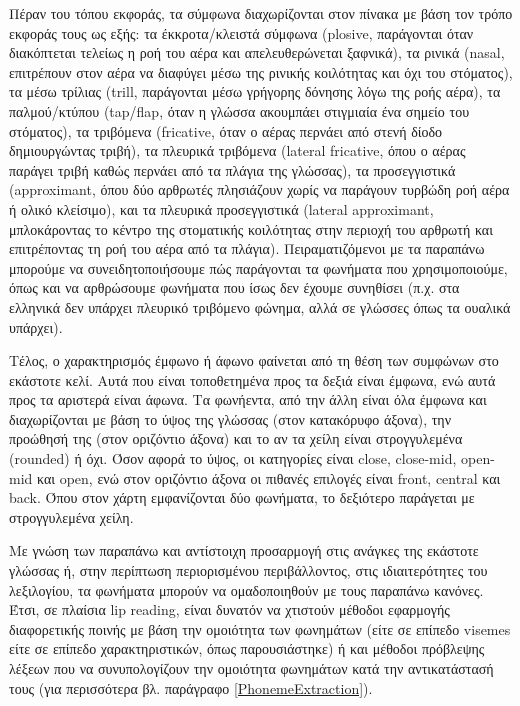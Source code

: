 Πέραν του τόπου εκφοράς, τα σύμφωνα διαχωρίζονται στον πίνακα με βάση τον τρόπο εκφοράς τους ως εξής: τα έκκροτα/κλειστά σύμφωνα (plosive, παράγονται όταν διακόπτεται τελείως η ροή του αέρα και απελευθερώνεται ξαφνικά), τα ρινικά (nasal, επιτρέπουν στον αέρα να διαφύγει μέσω της ρινικής κοιλότητας και όχι του στόματος), τα μέσω τρίλιας (trill, παράγονται μέσω γρήγορης δόνησης λόγω της ροής αέρα), τα παλμού/κτύπου (tap/flap, όταν η γλώσσα ακουμπάει στιγμιαία ένα σημείο του στόματος), τα τριβόμενα (fricative, όταν ο αέρας περνάει από στενή δίοδο δημιουργώντας τριβή), τα πλευρικά τριβόμενα (lateral fricative, όπου ο αέρας παράγει τριβή καθώς περνάει από τα πλάγια της γλώσσας), τα προσεγγιστικά (approximant, όπου δύο αρθρωτές πλησιάζουν χωρίς να παράγουν τυρβώδη ροή αέρα ή ολικό κλείσιμο), και τα πλευρικά προσεγγιστικά (lateral approximant, μπλοκάροντας το κέντρο της στοματικής κοιλότητας στην περιοχή του αρθρωτή και επιτρέποντας τη ροή του αέρα από τα πλάγια). Πειραματιζόμενοι με τα παραπάνω μπορούμε να συνειδητοποιήσουμε πώς παράγονται τα φωνήματα που χρησιμοποιούμε, όπως και να αρθρώσουμε φωνήματα που ίσως δεν έχουμε συνηθίσει (π.χ. στα ελληνικά δεν υπάρχει πλευρικό τριβόμενο φώνημα, αλλά σε γλώσσες όπως τα ουαλικά υπάρχει).

Τέλος, ο χαρακτηρισμός έμφωνο ή άφωνο φαίνεται από τη θέση των συμφώνων στο εκάστοτε κελί. Αυτά που είναι τοποθετημένα προς τα δεξιά είναι έμφωνα, ενώ αυτά προς τα αριστερά είναι άφωνα. Τα φωνήεντα, από την άλλη είναι όλα έμφωνα και διαχωρίζονται με βάση το ύψος της γλώσσας (στον κατακόρυφο άξονα), την προώθησή της (στον οριζόντιο άξονα) και το αν τα χείλη είναι στρογγυλεμένα (rounded) ή όχι. Όσον αφορά το ύψος, οι κατηγορίες είναι close, close-mid, open-mid και open, ενώ στον οριζόντιο άξονα οι πιθανές επιλογές είναι front, central και back. Όπου στον χάρτη εμφανίζονται δύο φωνήματα, το δεξιότερο παράγεται με στρογγυλεμένα χείλη.

Με γνώση των παραπάνω και αντίστοιχη προσαρμογή στις ανάγκες της εκάστοτε γλώσσας ή, στην περίπτωση περιορισμένου περιβάλλοντος, στις ιδιαιτερότητες του λεξιλογίου, τα φωνήματα μπορούν να ομαδοποιηθούν με τους παραπάνω κανόνες. Έτσι, σε πλαίσια lip reading, είναι δυνατόν να χτιστούν μέθοδοι εφαρμογής διαφορετικής ποινής με βάση την ομοιότητα των φωνημάτων (είτε σε επίπεδο visemes είτε σε επίπεδο χαρακτηριστικών, όπως παρουσιάστηκε) ή και μέθοδοι πρόβλεψης λέξεων που να συνυπολογίζουν την ομοιότητα φωνημάτων κατά την αντικατάστασή τους (για περισσότερα βλ. παράγραφο \ref{PhonemeExtraction}).


